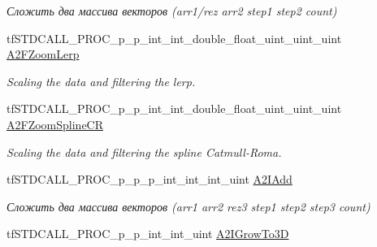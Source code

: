 \begin{DoxyCompactItemize}
\begin{DoxyCompactList}\small\item\em Сложить два массива векторов (arr1/rez arr2 step1 step2 count) \end{DoxyCompactList}\item 
\hypertarget{structs_functions_array_vector_c_p_u_a0c0bc795e725eef915ed797e922fff3a}{tf\-S\-T\-D\-C\-A\-L\-L\-\_\-\-P\-R\-O\-C\-\_\-p\-\_\-p\-\_\-int\-\_\-int\-\_\-double\-\_\-float\-\_\-uint\-\_\-uint\-\_\-uint \hyperlink{structs_functions_array_vector_c_p_u_a0c0bc795e725eef915ed797e922fff3a}{A2\-F\-Zoom\-Lerp}}\label{structs_functions_array_vector_c_p_u_a0c0bc795e725eef915ed797e922fff3a}

\begin{DoxyCompactList}\small\item\em Scaling the data and filtering the lerp. \end{DoxyCompactList}\item 
\hypertarget{structs_functions_array_vector_c_p_u_a39d476a3196eb3328e7982cb8384315f}{tf\-S\-T\-D\-C\-A\-L\-L\-\_\-\-P\-R\-O\-C\-\_\-p\-\_\-p\-\_\-int\-\_\-int\-\_\-double\-\_\-float\-\_\-uint\-\_\-uint\-\_\-uint \hyperlink{structs_functions_array_vector_c_p_u_a39d476a3196eb3328e7982cb8384315f}{A2\-F\-Zoom\-Spline\-C\-R}}\label{structs_functions_array_vector_c_p_u_a39d476a3196eb3328e7982cb8384315f}

\begin{DoxyCompactList}\small\item\em Scaling the data and filtering the spline Catmull-\/\-Roma. \end{DoxyCompactList}\item 
\hypertarget{structs_functions_array_vector_c_p_u_ab55b45c88a42d5d55987fd4aaa6e2975}{tf\-S\-T\-D\-C\-A\-L\-L\-\_\-\-P\-R\-O\-C\-\_\-p\-\_\-p\-\_\-p\-\_\-int\-\_\-int\-\_\-int\-\_\-uint \hyperlink{structs_functions_array_vector_c_p_u_ab55b45c88a42d5d55987fd4aaa6e2975}{A2\-I\-Add}}\label{structs_functions_array_vector_c_p_u_ab55b45c88a42d5d55987fd4aaa6e2975}

\begin{DoxyCompactList}\small\item\em Сложить два массива векторов (arr1 arr2 rez3 step1 step2 step3 count) \end{DoxyCompactList}\item 
\hypertarget{structs_functions_array_vector_c_p_u_acf104748adb1d452c7d0fca76b9adba5}{tf\-S\-T\-D\-C\-A\-L\-L\-\_\-\-P\-R\-O\-C\-\_\-p\-\_\-p\-\_\-int\-\_\-int\-\_\-uint \hyperlink{structs_functions_array_vector_c_p_u_acf104748adb1d452c7d0fca76b9adba5}{A2\-I\-Grow\-To3\-D}}\label{structs_functions_array_vector_c_p_u_acf104748adb1d452c7d0fca76b9adba5}


\end{DoxyCompactItemize}
